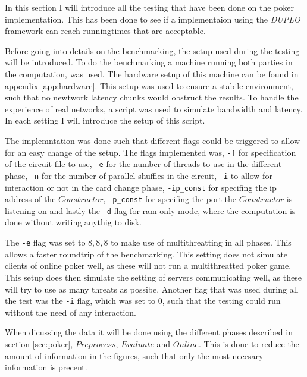 \documentclass[twoside,11pt,openright]{report}
\newcommand{\DUPLO}{\textit{DUPLO} }
\begin{document}
In this section I will introduce all the testing that have been done on the poker implementation. This has been done to see if a implementaion using the \DUPLO framework can reach runningtimes that are acceptable. 

Before going into details on the benchmarking, the setup used during the testing will be introduced. To do the benchmarking a machine running both parties in the computation, was used. The hardware setup of this machine can be found in appendix \ref{app:hardware}. This setup was used to ensure a stabile environment, such that no newtwork latency chunks would obstruct the results. To handle the experience of real networks, a script was used to simulate bandwidth and latency. In each setting I will introduce the setup of this script. 

\bigskip

The implemntation was done such that different flags could be triggered to allow for an easy change of the setup. The flags implemented was, \verb|-f| for specification of the circuit file to use, \verb|-e| for the number of threads to use in the different phase, \verb|-n| for the number of parallel shuffles in the circuit, \verb|-i| to allow for interaction or not in the card change phase, \verb|-ip_const| for specifing the ip address of the $Constructor$, \verb|-p_const| for specifing the port the $Constructor$ is listening on and lastly the \verb|-d| flag for ram only mode, where the computation is done without writing anythig to disk.

The \verb|-e| flag was set to $8,8,8$ to make use of multithreatting in all phases. This allows a faster roundtrip of the benchmarking. This setting does not simulate clients of online poker well, as these will not run a multithreatted poker game. This setup does then simulate the setting of servers communicating well, as these will try to use as many threats as possibe. Another flag that was used during all the test was the \verb|-i| flag, which was set to $0$, such that the testing could run without the need of any interaction.

When dicussing the data it will be done using the different phases described in section \ref{sec:poker}, $Preprocess$, $Evaluate$ and $Online$. This is done to reduce the amount of information in the figures, such that only the most necesary information is precent.

\bigskip
\end{document}
